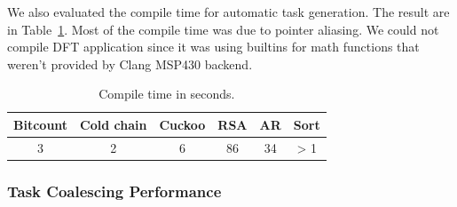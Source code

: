 We also evaluated the compile time for automatic task generation. The result are in Table~\ref{table:compile_time}.
Most of the compile time was due to pointer aliasing. We could not compile DFT application since it was using
builtins for math functions that weren't provided by Clang MSP430 backend.

\begin{table}[t]
	\centering
	\footnotesize
	\begin{tabular}{|c|c|c|c|c|c|}
		\hline
		Bitcount & Cold chain & Cuckoo & RSA & AR & Sort \\
		\hline\hline
		3 & 2 & 6 & 86 & 34 & > 1 \\
		\hline
	\end{tabular}
	\caption{Compile time in seconds.}
\label{table:compile_time}
\end{table}

\subsubsection{Task Coalescing Performance}
\label{sec:results_coalescing}

